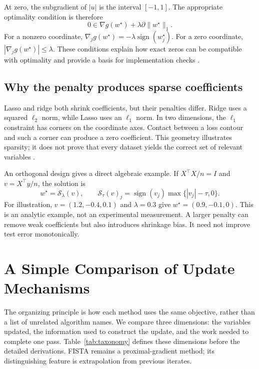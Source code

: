 \documentclass[11pt,a4paper]{article}
\newcommand{\soft}{\mathcal{S}}
\begin{document}
At zero, the subgradient of $|u|$ is the interval $[-1,1]$. The appropriate optimality condition is therefore
\begin{equation}
0\in\nabla g(w^\star)+\lambda\partial\|w^\star\|_1.
\label{eq:optimality}
\end{equation}
For a nonzero coordinate, $\nabla_jg(w^\star)=-\lambda\operatorname{sign}(w_j^\star)$. For a zero coordinate, $|\nabla_jg(w^\star)|\leq\lambda$. These conditions explain how exact zeros can be compatible with optimality and provide a basis for implementation checks \cite{parikh2014}.

\subsection{Why the penalty produces sparse coefficients}
Lasso and ridge both shrink coefficients, but their penalties differ. Ridge uses a squared $\ell_2$ norm, while Lasso uses an $\ell_1$ norm. In two dimensions, the $\ell_1$ constraint has corners on the coordinate axes. Contact between a loss contour and such a corner can produce a zero coefficient. This geometry illustrates sparsity; it does not prove that every dataset yields the correct set of relevant variables \cite{tibshirani1996}.

An orthogonal design gives a direct algebraic example. If $X^\top X/n=I$ and $v=X^\top y/n$, the solution is
\begin{equation}
w^\star=\soft_\lambda(v),\qquad
\soft_\tau(v)_j=\operatorname{sign}(v_j)\max\{|v_j|-\tau,0\}.
\label{eq:soft}
\end{equation}
For illustration, $v=(1.2,-0.4,0.1)$ and $\lambda=0.3$ give $w^\star=(0.9,-0.1,0)$. This is an analytic example, not an experimental measurement. A larger penalty can remove weak coefficients but also introduces shrinkage bias. It need not improve test error monotonically.

\section{A Simple Comparison of Update Mechanisms}
The organizing principle is how each method uses the same objective, rather than a list of unrelated algorithm names. We compare three dimensions: the variables updated, the information used to construct the update, and the work needed to complete one pass. Table~\ref{tab:taxonomy} defines these dimensions before the detailed derivations. FISTA remains a proximal-gradient method; its distinguishing feature is extrapolation from previous iterates.
\end{document}
